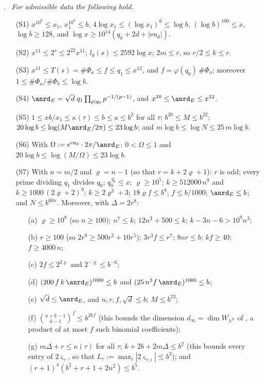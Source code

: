 \documentclass[10pt]{amsart}
\theoremstyle{definition}
\theoremstyle{remark}
\providecommand{\anPa}{\Phi_a}
\providecommand{\anPb}{\Phi_b}
\providecommand{\aneu}{\mathrm{eu}_d}
\newenvironment{quotedthm}[2]{\par\medskip\noindent\begingroup
  \textbf{#1}#2.\ \itshape\ignorespaces}{\endgroup\par\medskip}
\begin{document}
\begin{quotedthm}{\cite[Lemma~13.4]{P46}}{}
For admissible data the following hold.
\begin{enumerate}
\item[(S1)] $x^{10^{6}}\le x_1$, $x_1^{10^{6}}\le b$,
$4\log x_1\le(\log x_1)^{6}\le\log b$,
$(\log b)^{100}\le x$, $\log b\ge128$, and
$\log x\ge10^{14}(q_0+2d+|\aneu|)$.
\item[(S2)] $x^{11}\le2^{s}\le2^{22}x^{11}$; $l_0(s)\le2592\log x$;
$2m\le r$, so $r/2\le k\le r$.
\item[(S3)] $x^{11}\le T(s)=\#\anPa\le f\le q_1\le x^{12}$, and
$f=\varphi(q_0)\,\#\anPa$; moreover $1\le\#\anPa/\#\anPb\le\log b$.
\item[(S4)] $\anrd_E=\sqrt d\;q_1\prod_{p\mid q_0}p^{-1/(p-1)}$, and
$x^{10}\le\anrd_E\le x^{12}$.
\item[(S5)] $1\le xb/x_1\le\kappa(\tau)\le b\le a\le b^{2}$ for all $\tau$;
$b^{20}\le M\le b^{22}$;
$20\log b\le\log(M\anrd_E/2\pi)\le23\log b$; and
$m\log b\le\log N\le25\,m\log b$.
\item[(S6)] With $\Omega:=e^{\aneu}\cdot2\pi/\anrd_E$: $0<\Omega\le1$ and
$20\log b\le\log(M/\Omega)\le23\log b$.
\item[(S7)] With $n=m/2$ and $\varrho=n-1$ (so that $r=k+2\varrho+1$): $r$ is odd; every prime
dividing $q_1$ divides $q_0$; $q_0^{\,q_0}\le x$; $\varrho\ge10^{5}$;
$k\ge512000\,n^{9}$ and $k\ge1000\,(2\varrho+2)^{9}$; $k\ge2\varrho^{2}+3$; $18\varrho f\le b^{8}$;
$f\le b/1000$; $\anrd_E\le b$; and $N\le b^{60n}$. Moreover, with $\Delta=2r^{8}$:
\begin{itemize}
\item[(a)] $\varrho\ge10^{8}$ (so $n\ge100$); $n^{7}\le k$; $12n^{3}+500\le k$; $k-3n-6>10^{9}n^{3}$;
\item[(b)] $r\ge100$ (so $2r^{8}\ge500r^{3}+10r^{5}$); $3r^{3}f\le r^{7}$; $8nr\le b$; $kf\ge40$; $f\ge4000\,n$;
\item[(c)] $2f\le2^{2\varrho}$ and $2^{-\varrho}\le b^{-6}$;
\item[(d)] $(200\,f\,k\,\anrd_E)^{1000}\le b$ and $(25\,n^{3}f\,\anrd_E)^{1000}\le b$;
\item[(e)] $\sqrt d\le\anrd_E$, and $n,r,f,\sqrt d\le b$; $M\le b^{23}$;
\item[(f)] $\binom{a+k-1}{k-1}^{f}\le b^{2kf}$ (this bounds the dimension $d_\infty=\dim W_{\lambda^X}$ of
{\cite[\S14.3]{P46}}, a product of at most $f$ such binomial coefficients);
\item[(g)] $m\Delta+r\le\kappa(\tau)$ for all $\tau$; $k+2b+2m\Delta\le b^{2}$ (this bounds every
entry of $2\varsigma_\tau$, so that $L_\tau:=\max_i|2\varsigma_{\tau,i}|\le b^{2}$); and
$(r+1)^{4}(b^{2}+r+1+2n^{2})\le b^{5}$.
\end{itemize}
\end{enumerate}
\end{quotedthm}
\end{document}
